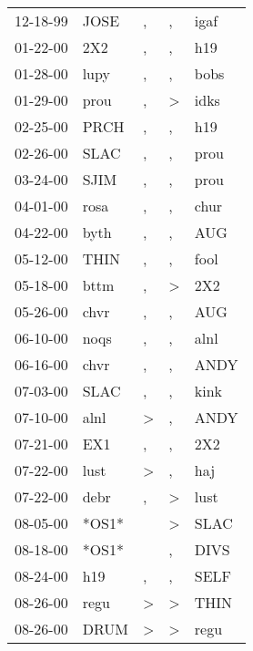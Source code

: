 \begin{supertabular}{lllll}
 12-18-99 &   JOSE &                , &                , &   igaf \\
 01-22-00 &    2X2 &                , &                , &    h19 \\
 01-28-00 &   lupy &                , &                , &   bobs \\
 01-29-00 &   prou &                , &     \textgreater &   idks \\
 02-25-00 &   PRCH &                , &                , &    h19 \\
 02-26-00 &   SLAC &                , &                , &   prou \\
 03-24-00 &   SJIM &                , &                , &   prou \\
 04-01-00 &   rosa &                , &                , &   chur \\
 04-22-00 &   byth &                , &                , &    AUG \\
 05-12-00 &   THIN &                , &                , &   fool \\
 05-18-00 &   bttm &                , &     \textgreater &    2X2 \\
 05-26-00 &   chvr &                , &                , &    AUG \\
 06-10-00 &   noqs &                , &                , &   alnl \\
 06-16-00 &   chvr &                , &                , &   ANDY \\
 07-03-00 &   SLAC &                , &                , &   kink \\
 07-10-00 &   alnl &     \textgreater &                , &   ANDY \\
 07-21-00 &    EX1 &                , &                , &    2X2 \\
 07-22-00 &   lust &     \textgreater &                , &    haj \\
 07-22-00 &   debr &                , &     \textgreater &   lust \\
 08-05-00 &  *OS1* &                  &     \textgreater &   SLAC \\
 08-18-00 &  *OS1* &                  &                , &   DIVS \\
 08-24-00 &    h19 &                , &                , &   SELF \\
 08-26-00 &   regu &     \textgreater &     \textgreater &   THIN \\
 08-26-00 &   DRUM &     \textgreater &     \textgreater &   regu \\

\end{supertabular}
